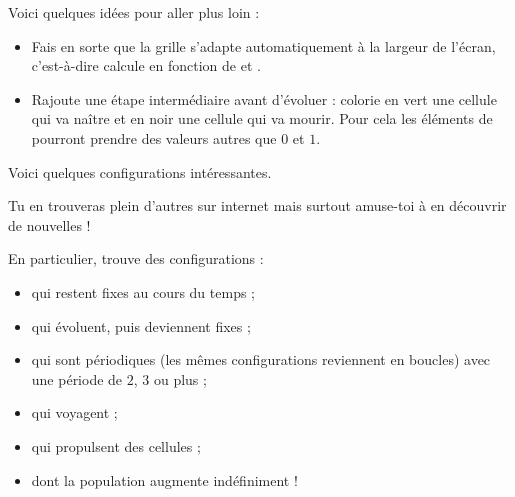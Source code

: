 \documentclass[11pt,class=report,crop=false]{standalone}
\begin{document}
Voici quelques idées pour aller plus loin :
\begin{itemize}
  \item Fais en sorte que la grille s'adapte automatiquement à la largeur de l'écran, c'est-à-dire calcule  en fonction de  et .
  
  \item Rajoute une étape intermédiaire avant d'évoluer : colorie en vert une cellule qui va naître et en noir une cellule qui va mourir. Pour cela les éléments de  pourront prendre des valeurs autres que $0$ et $1$.
\end{itemize}

Voici quelques configurations intéressantes. 

Tu en trouveras plein d'autres sur internet mais surtout amuse-toi à en découvrir de nouvelles !

En particulier, trouve des configurations :
\begin{itemize}
  \item qui restent fixes au cours du temps ;
  \item qui évoluent, puis deviennent fixes ;
  \item qui sont périodiques (les mêmes configurations reviennent en boucles) avec une période de $2$, $3$ ou plus ;
  \item qui voyagent ;
  \item qui propulsent des cellules ; 
  \item dont la population augmente indéfiniment !
\end{itemize}
\end{document}
